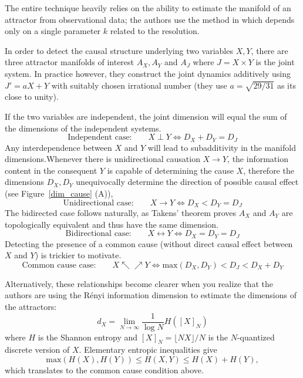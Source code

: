 \documentclass[12pt]{article}
\theoremstyle{definition}
\theoremstyle{remark}
\newcommand{\speccite}[1]{\citetitle{#1} \parencite{#1}}
\begin{document}
The entire technique heavily relies on the ability to estimate the manifold of an attractor from observational data; the authors use the method in \speccite{szepesvari2007manifold} which depends only on a single parameter $k$ related to the resolution.

In order to detect the causal structure underlying two variables $X, Y$, there are three attractor manifolds of interest $A_X, A_Y$ and $A_J$ where $J = X \times Y$ is the joint system. In practice however, they construct the joint dynamics additively using $J' = a X + Y$ with suitably chosen irrational number (they use $a = \sqrt{29/31}$ as its close to unity).

If the two variables are independent, the joint dimension will equal the sum of the dimensions of the independent systems.
\[ \text{Independent case:}\qquad  X \perp Y \iff D_X + D_Y = D_J \]
Any interdependence between $X$ and $Y$ will lead to subadditivity in the manifold dimensions.Whenever there is unidirectional causation $X \to Y$, the information content in the consequent $Y$ is capable of determining the cause $X$, therefore the dimensions $D_X, D_Y$ unequivocally determine the direction of possible causal effect (see Figure~\ref{dim_cause} (A)),
\[ \text{Unidirectional case:}\qquad X \to Y \iff D_X < D_Y = D_J \]
The bidirected case follows naturally, as Takens' theorem proves $A_X$ and $A_Y$ are topologically equivalent and thus have the same dimension.
\[ \text{Bidirectional case:}\qquad X \leftrightarrow Y \iff D_X = D_Y = D_J \]
Detecting the presence of a common cause (without direct causal effect between $X$ and $Y$) is trickier to motivate.
\[ \text{Common cause case:}\qquad X \nwarrow\!\nearrow Y \iff \mathrm{max}(D_X, D_Y) < D_J < D_X + D_Y \]

Alternatively, these relationships become clearer when you realize that the authors are using the Rényi information dimension to estimate the dimensions of the attractors:
\[ d_X = \lim_{N \to \infty} \frac{1}{\log N} H ( [X]_N ) \]
where $H$ is the Shannon entropy and $[X]_N = \lfloor NX \rfloor  / N$ is the $N$-quantized discrete version of $X$. Elementary entropic inequalities give
\[ \mathrm{max}(H(X), H(Y)) \leq H(X, Y) \leq H(X) + H(Y), \]
which translates to the common cause condition above.
\end{document}
